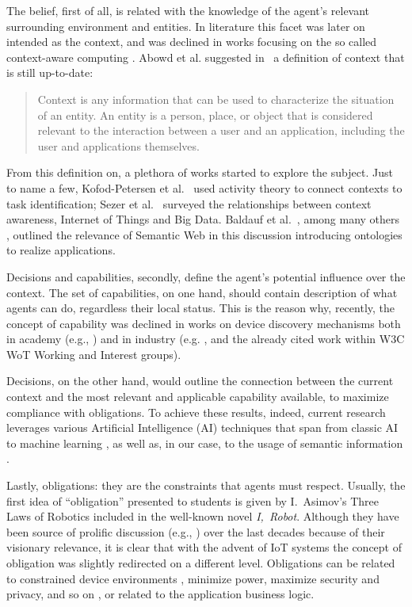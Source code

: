 The belief, first of all, is related with the knowledge of the agent's relevant surrounding environment and entities. In literature this facet was later on intended as the context, and was declined in works focusing on the so called context-aware computing \cite{schilit1994context, dourish2001seeking}. Abowd et al. suggested in~\cite{abowd1999towards} a definition of context that is still up-to-date:
\begin{quote}
Context is any information that can be used to characterize the situation of an entity. An entity is a person, place, or object that is
considered relevant to the interaction between a user and an application, including the user and applications themselves.
\end{quote}
From this definition on, a plethora of works started to explore the subject. Just to name a few, Kofod-Petersen et al.~\cite{kofod2005using} used activity theory to connect contexts to task identification; Sezer et al.~\cite{sezer2018context} surveyed the relationships between context awareness, Internet of Things and Big Data. Baldauf et al.~\cite{baldauf2007survey}, among many others \cite{gu2004ontology, broens2004context, alirezaie2017ontology, cabrera20193lconont}, outlined the relevance of Semantic Web in this discussion introducing ontologies to realize applications.  

Decisions and capabilities, secondly, define the agent's potential influence over the context. The set of capabilities, on one hand, should contain description of what agents can do, regardless their local status. This is the reason why, recently, the concept of capability was declined in works on device discovery mechanisms both in academy (e.g., \cite{ccori2016device, ashraf2016device}) and in industry (e.g. \cite{zhou2017server}, and the already cited work within W3C WoT Working and Interest groups). 

Decisions, on the other hand, would outline the connection between the current context and the most relevant and applicable capability available, to maximize compliance with obligations. To achieve these results, indeed, current research leverages various Artificial Intelligence (AI) techniques that span from classic AI to machine learning \cite{ding2013intelligent, wanigasekara2016bandit}, as well as, in our case, to the usage of semantic information \cite{kovacs2016standards, ganzha2017semantic}.

Lastly, obligations: they are the constraints that agents must respect. Usually, the first idea of ``obligation'' presented to students is given by I.~Asimov's Three Laws of Robotics included in the well-known novel \textit{I,~Robot}. Although they have been source of prolific discussion (e.g., \cite{murphy2009beyond}) over the last decades because of their visionary relevance, it is clear that with the advent of IoT systems the concept of obligation was slightly redirected on a different level. Obligations can be related to constrained device environments \cite{bormann2014terminology}, minimize power, maximize security and privacy, and so on \cite{haroon2016constraints}, or related to the application business logic.

